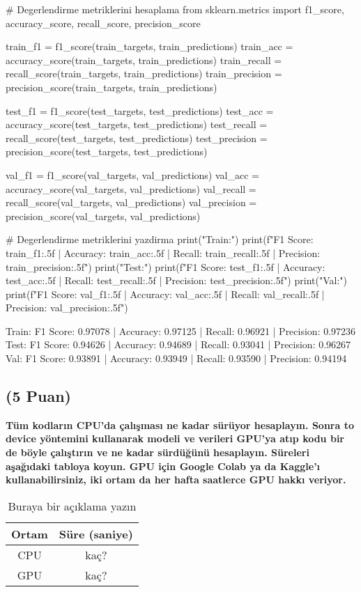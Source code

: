 \documentclass[11pt]{article}
\begin{document}
\begin{python}
# Degerlendirme metriklerini hesaplama
from sklearn.metrics import f1_score, accuracy_score, recall_score, precision_score

train_f1 = f1_score(train_targets, train_predictions)
train_acc = accuracy_score(train_targets, train_predictions)
train_recall = recall_score(train_targets, train_predictions)
train_precision = precision_score(train_targets, train_predictions)

test_f1 = f1_score(test_targets, test_predictions)
test_acc = accuracy_score(test_targets, test_predictions)
test_recall = recall_score(test_targets, test_predictions)
test_precision = precision_score(test_targets, test_predictions)

val_f1 = f1_score(val_targets, val_predictions)
val_acc = accuracy_score(val_targets, val_predictions)
val_recall = recall_score(val_targets, val_predictions)
val_precision = precision_score(val_targets, val_predictions)

# Degerlendirme metriklerini yazdirma
print("Train:")
print(f"F1 Score: {train_f1:.5f} | Accuracy: {train_acc:.5f} | Recall: {train_recall:.5f} | Precision: {train_precision:.5f}")
print("Test:")
print(f"F1 Score: {test_f1:.5f} | Accuracy: {test_acc:.5f} | Recall: {test_recall:.5f} | Precision: {test_precision:.5f}")
print("Val:")
print(f"F1 Score: {val_f1:.5f} | Accuracy: {val_acc:.5f} | Recall: {val_recall:.5f} | Precision: {val_precision:.5f}")
\end{python}

Train:
F1 Score: 0.97078 | Accuracy: 0.97125 | Recall: 0.96921 | Precision: 0.97236
Test:
F1 Score: 0.94626 | Accuracy: 0.94689 | Recall: 0.93041 | Precision: 0.96267
Val:
F1 Score: 0.93891 | Accuracy: 0.93949 | Recall: 0.93590 | Precision: 0.94194


\subsection{(5 Puan)} \textbf{Tüm kodların CPU'da çalışması ne kadar sürüyor hesaplayın. Sonra to device yöntemini kullanarak modeli ve verileri GPU'ya atıp kodu bir de böyle çalıştırın ve ne kadar sürdüğünü hesaplayın. Süreleri aşağıdaki tabloya koyun. GPU için Google Colab ya da Kaggle'ı kullanabilirsiniz, iki ortam da her hafta saatlerce GPU hakkı veriyor.}

\begin{table}[ht!]
    \centering
    \caption{Buraya bir açıklama yazın}
    \begin{tabular}{c|c}
        Ortam & Süre (saniye) \\\hline
        CPU & kaç? \\
        GPU & kaç?\\
    \end{tabular}
    \label{tab:my_table}
\end{table}
\end{document}
